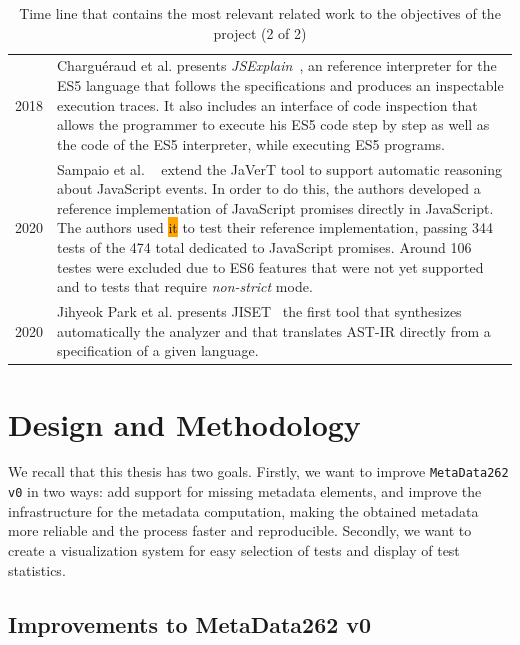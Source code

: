 \documentclass[runningheads]{llncs}
\begin{document}
\begin{table}[ht!]
\begin{tabular}{@{\,}r <{\hskip 2pt} !{\makebox[0pt]{\textbullet}\hskip-0.5pt\vrule width 1pt\hspace{\labelsep}} >{\raggedright\arraybackslash}p{316pt}}
  2018 & Charguéraud et al. presents \emph{JSExplain}~\cite{JSExplain-2018}, an reference interpreter for the ES5 language that follows the specifications and produces an inspectable execution traces. It also includes an interface of code inspection that allows the programmer to execute his ES5 code step by step as well as the code of the ES5 interpreter, while executing ES5 programs.\\
  2020 & Sampaio et al. ~\cite{Javert-2020} extend the JaVerT tool to support automatic reasoning about JavaScript events. In order to do this, the authors developed a reference implementation of JavaScript promises directly in JavaScript. The authors used \colorbox{orange}{it} to test their reference implementation, passing 344 tests of the 474 total dedicated to JavaScript promises. Around 106 testes were excluded due to ES6 features that were not yet supported and to tests that require \emph{non-strict} mode.\\
  2020 & Jihyeok Park et al. presents JISET~\cite{JISET-2020} the first tool that synthesizes automatically the analyzer and that translates AST-IR directly from a specification of a given language.
\end{tabular}
\vspace{1em}
\caption{Time line that contains the most relevant related work to the objectives of the project (2 of 2)}
\label{tab:related-work_timeline-2}
\end{table}


\section{Design and Methodology}
\label{sec:Design and Methodology}



We recall that this thesis has two goals. Firstly, we want to improve \texttt{MetaData262 v0} in two ways: add support for missing metadata elements, and improve the infrastructure for the metadata computation, making the obtained metadata more reliable and the process faster and reproducible. Secondly, we want to create a visualization system for easy selection of tests and display of test statistics.


\subsection{Improvements to MetaData262 v0}
\label{sub:improvements_to_metadata262_v0}
\end{document}
